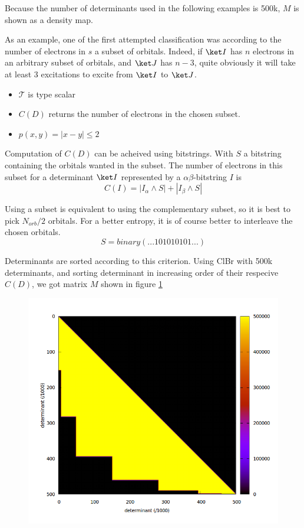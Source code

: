 Because the number of determinants used in the following examples is 500k, $M$ is shown as a density map.

As an example, one of the first attempted classification was according to the number of electrons in $s$ a subset of orbitals. Indeed, if $\ket I$ has $n$ electrons in an arbitrary subset of orbitals, and $\ket J$ has $n-3$, quite obviously it will take at least 3 excitations to excite from $\ket I$ to $\ket J$.
\begin{itemize}
	\item
	$\mathcal{T}$ is type scalar
	\item
	$C(D)$ returns the number of electrons in the chosen subset.
	\item
	$p(x, y) = |x-y| \leq 2$
\end{itemize}

Computation of $C(D)$ can be acheived using bitstrings. With $S$ a bitstring containing the orbitals wanted in the subset. The number of electrons in this subset for a determinant $\ket I$ represented by a $\alpha \beta$-bitstring $I$ is
\begin{equation}
C(I)=|I_{\alpha} \wedge S|+|I_{\beta} \wedge S|
\end{equation}

Using a subset is equivalent to using the complementary subset, so it is best to pick $N_{orb}/2$ orbitals. For a better entropy, it is of course better to interleave the chosen orbitals.
\begin{equation}
S=binary(...101010101...)
\end{equation}
    
Determinants are sorted according to this criterion. Using ClBr with 500k determinants, and sorting determinant in increasing order of their respecive $C(D)$, we got matrix $M$ shown in figure \ref{fig:num_subspace}

\begin{figure}[h!]
	\begin{center}
		\includegraphics[width=0.6\columnwidth]{figures/davidson/num_subspace}
		\caption{{\label{fig:num_subspace}
		}}
	\end{center}
\end{figure}
    
